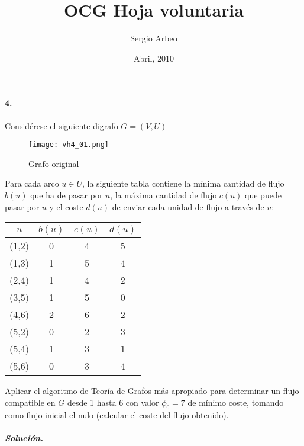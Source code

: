\documentclass[12pt, oneside, a4paper]{article}
\begin{document}
\title{OCG Hoja voluntaria}\author{Sergio Arbeo}\date{Abril, 2010}\maketitle
\paragraph{4.}\label{ssub:1_} %
Considérese el siguiente digrafo $G=(V,U)$

\begin{figure}
\centering
\texttt{[image: vh4\_01.png]}
\caption{Grafo original}
\label{fig:vh4-01}
\end{figure}

Para cada arco $u\in U$, la siguiente tabla contiene la mínima
cantidad de flujo $b(u)$ que ha de pasar por $u$, la máxima cantidad
de flujo $c(u)$ que puede pasar por $u$ y el coste $d(u)$ de enviar
cada unidad de flujo a través de $u$:

\begin{tabular}{| c | c | c | c |}
\hline
$u$   & $b(u)$ & $c(u)$ & $d(u)$ \\
\hline
(1,2) &   0    &   4    &   5    \\
(1,3) &   1    &   5    &   4    \\
(2,4) &   1    &   4    &   2    \\
(3,5) &   1    &   5    &   0    \\
(4,6) &   2    &   6    &   2    \\
(5,2) &   0    &   2    &   3    \\
(5,4) &   1    &   3    &   1    \\
(5,6) &   0    &   3    &   4    \\
\hline
\end{tabular}

Aplicar el algoritmo de Teoría de Grafos más apropiado para determinar
un flujo compatible en $G$ desde 1 hasta 6 con valor $\phi_{0}=7$ de
mínimo coste, tomando como flujo inicial el nulo (calcular el coste
del flujo obtenido).

\subparagraph{Solución.\\}
\end{document}
